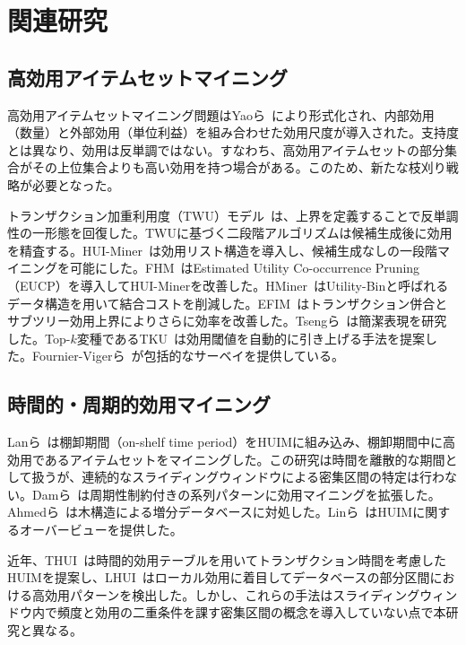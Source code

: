 \section{関連研究}
\label{sec:related}

\subsection{高効用アイテムセットマイニング}
高効用アイテムセットマイニング問題はYaoら~\cite{yao2006mining}により形式化され、内部効用（数量）と外部効用（単位利益）を組み合わせた効用尺度が導入された。支持度とは異なり、効用は反単調ではない。すなわち、高効用アイテムセットの部分集合がその上位集合よりも高い効用を持つ場合がある。このため、新たな枝刈り戦略が必要となった。

トランザクション加重利用度（TWU）モデル~\cite{liu2012mining}は、上界を定義することで反単調性の一形態を回復した。TWUに基づく二段階アルゴリズムは候補生成後に効用を精査する。HUI-Miner~\cite{liu2012mining}は効用リスト構造を導入し、候補生成なしの一段階マイニングを可能にした。FHM~\cite{fournier2014fhm}はEstimated Utility Co-occurrence Pruning（EUCP）を導入してHUI-Minerを改善した。HMiner~\cite{krishnamoorthy2019hminer}はUtility-Binと呼ばれるデータ構造を用いて結合コストを削減した。EFIM~\cite{zida2015efim}はトランザクション併合とサブツリー効用上界によりさらに効率を改善した。Tsengら~\cite{tseng2013efficient}は簡潔表現を研究した。Top-$k$変種であるTKU~\cite{tseng2016tku}は効用閾値を自動的に引き上げる手法を提案した。Fournier-Vigerら~\cite{fournier2019survey}が包括的なサーベイを提供している。

\subsection{時間的・周期的効用マイニング}
Lanら~\cite{lan2014discovery}は棚卸期間（on-shelf time period）をHUIMに組み込み、棚卸期間中に高効用であるアイテムセットをマイニングした。この研究は時間を離散的な期間として扱うが、連続的なスライディングウィンドウによる密集区間の特定は行わない。Damら~\cite{dam2019towards}は周期性制約付きの系列パターンに効用マイニングを拡張した。Ahmedら~\cite{ahmed2009efficient}は木構造による増分データベースに対処した。Linら~\cite{lin2016high}はHUIMに関するオーバービューを提供した。

近年、THUI~\cite{zhang2023thui}は時間的効用テーブルを用いてトランザクション時間を考慮したHUIMを提案し、LHUI~\cite{fournier2021lhui}はローカル効用に着目してデータベースの部分区間における高効用パターンを検出した。しかし、これらの手法はスライディングウィンドウ内で頻度と効用の二重条件を課す密集区間の概念を導入していない点で本研究と異なる。

